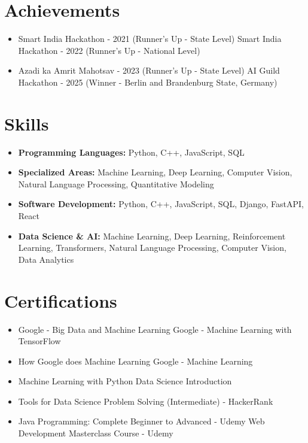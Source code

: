 \documentclass[a4paper,10pt]{article}
\begin{document}
\section*{Achievements}
\begin{itemize}
\item Smart India Hackathon - 2021 (Runner's Up - State Level) \hfill Smart India Hackathon - 2022 (Runner's Up - National Level)
\item Azadi ka Amrit Mahotsav - 2023 (Runner's Up - State Level) \hfill AI Guild Hackathon - 2025 (Winner - Berlin and Brandenburg State, Germany)
\end{itemize}

\section*{Skills}
\begin{itemize}
  \item \textbf{Programming Languages:} Python, C++, JavaScript, SQL
  \item \textbf{Specialized Areas:} Machine Learning, Deep Learning, Computer Vision, Natural Language Processing, Quantitative Modeling
  \item \textbf{Software Development:} Python, C++, JavaScript, SQL, Django, FastAPI, React
  \item \textbf{Data Science \& AI:} Machine Learning, Deep Learning, Reinforcement Learning, Transformers, Natural Language Processing, Computer Vision, Data Analytics
\end{itemize}

\section*{Certifications}
\begin{itemize}
\item Google - Big Data and Machine Learning \hfill Google - Machine Learning with TensorFlow
\item How Google does Machine Learning \hfill Google - Machine Learning
\item Machine Learning with Python \hfill Data Science Introduction
\item Tools for Data Science \hfill Problem Solving (Intermediate) - HackerRank
\item Java Programming: Complete Beginner to Advanced - Udemy \hfill Web Development Masterclass Course - Udemy
\end{itemize}
\end{document}

